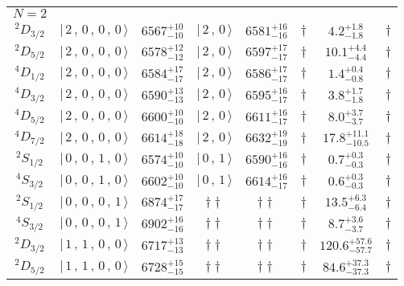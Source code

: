 \begin{tabular}{c| c c c c c c c}
\hline
 $N=2$  &  &  &  &  &  \\ 
$^{2}D_{3/2}$ & $\vert \,2\,,\,0\,,\,0\,,\,0 \,\rangle $ & $6567^{+10}_{-10}$ & $\vert \,2\,,\,0 \,\rangle$ & $6581^{+16}_{-16}$ & $\dagger$ & $4.2^{+1.8}_{-1.8}$ & $\dagger$ \\ 
$^{2}D_{5/2}$ & $\vert \,2\,,\,0\,,\,0\,,\,0 \,\rangle $ & $6578^{+12}_{-12}$ & $\vert \,2\,,\,0 \,\rangle$ & $6597^{+17}_{-17}$ & $\dagger$ & $10.1^{+4.4}_{-4.4}$ & $\dagger$ \\ 
$^{4}D_{1/2}$ & $\vert \,2\,,\,0\,,\,0\,,\,0 \,\rangle $ & $6584^{+17}_{-17}$ & $\vert \,2\,,\,0 \,\rangle$ & $6586^{+17}_{-17}$ & $\dagger$ & $1.4^{+0.4}_{-0.8}$ & $\dagger$ \\ 
$^{4}D_{3/2}$ & $\vert \,2\,,\,0\,,\,0\,,\,0 \,\rangle $ & $6590^{+13}_{-13}$ & $\vert \,2\,,\,0 \,\rangle$ & $6595^{+16}_{-17}$ & $\dagger$ & $3.8^{+1.7}_{-1.8}$ & $\dagger$ \\ 
$^{4}D_{5/2}$ & $\vert \,2\,,\,0\,,\,0\,,\,0 \,\rangle $ & $6600^{+10}_{-10}$ & $\vert \,2\,,\,0 \,\rangle$ & $6611^{+16}_{-17}$ & $\dagger$ & $8.0^{+3.7}_{-3.7}$ & $\dagger$ \\ 
$^{4}D_{7/2}$ & $\vert \,2\,,\,0\,,\,0\,,\,0 \,\rangle $ & $6614^{+18}_{-18}$ & $\vert \,2\,,\,0 \,\rangle$ & $6632^{+19}_{-19}$ & $\dagger$ & $17.8^{+11.1}_{-10.5}$ & $\dagger$ \\ 
$^{2}S_{1/2}$ & $\vert \,0\,,\,0\,,\,1\,,\,0 \,\rangle $ & $6574^{+10}_{-10}$ & $\vert \,0\,,\,1 \,\rangle$ & $6590^{+16}_{-16}$ & $\dagger$ & $0.7^{+0.3}_{-0.3}$ & $\dagger$ \\ 
$^{4}S_{3/2}$ & $\vert \,0\,,\,0\,,\,1\,,\,0 \,\rangle $ & $6602^{+10}_{-10}$ & $\vert \,0\,,\,1 \,\rangle$ & $6614^{+16}_{-17}$ & $\dagger$ & $0.6^{+0.3}_{-0.3}$ & $\dagger$ \\ 
$^{2}S_{1/2}$ & $\vert \,0\,,\,0\,,\,0\,,\,1 \,\rangle $ & $6874^{+17}_{-17}$ & $\dagger\dagger$ & $\dagger\dagger$ & $\dagger$ & $13.5^{+6.3}_{-6.4}$ & $\dagger$ \\ 
$^{4}S_{3/2}$ & $\vert \,0\,,\,0\,,\,0\,,\,1 \,\rangle $ & $6902^{+16}_{-16}$ & $\dagger\dagger$ & $\dagger\dagger$ & $\dagger$ & $8.7^{+3.6}_{-3.7}$ & $\dagger$ \\ 
$^{2}D_{3/2}$ & $\vert \,1\,,\,1\,,\,0\,,\,0 \,\rangle $ & $6717^{+13}_{-13}$ & $\dagger\dagger$ & $\dagger\dagger$ & $\dagger$ & $120.6^{+57.6}_{-57.7}$ & $\dagger$ \\ 
$^{2}D_{5/2}$ & $\vert \,1\,,\,1\,,\,0\,,\,0 \,\rangle $ & $6728^{+15}_{-15}$ & $\dagger\dagger$ & $\dagger\dagger$ & $\dagger$ & $84.6^{+37.3}_{-37.3}$ & $\dagger$ \\ 

\end{tabular}
